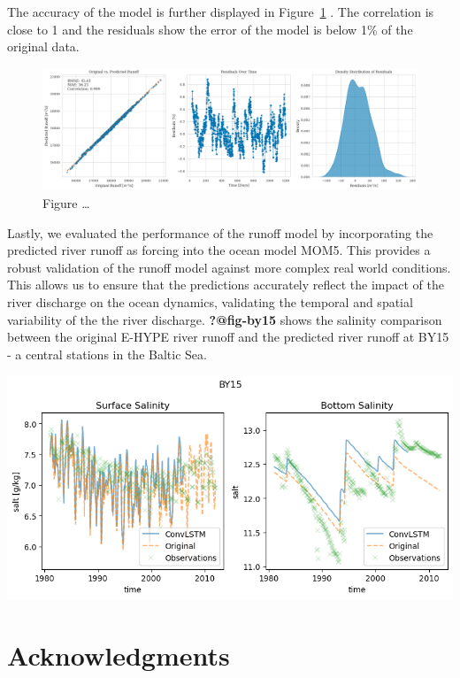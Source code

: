 \documentclass[
]{agujournal2019}
\begin{document}
The accuracy of the model is further displayed in
Figure~\ref{fig-statistical-evaluationNN} . The correlation is close to
1 and the residuals show the error of the model is below 1\% of the
original data.

\begin{figure}

{\centering \includegraphics{images/paste-4.png}

}

\caption{\label{fig-statistical-evaluationNN}Figure \ldots{}}

\end{figure}

Lastly, we evaluated the performance of the runoff model by
incorporating the predicted river runoff as forcing into the ocean model
MOM5. This provides a robust validation of the runoff model against more
complex real world conditions. This allows us to ensure that the
predictions accurately reflect the impact of the river discharge on the
ocean dynamics, validating the temporal and spatial variability of the
the river discharge. \textbf{?@fig-by15} shows the salinity comparison
between the original E-HYPE river runoff and the predicted river runoff
at BY15 - a central stations in the Baltic Sea.

\includegraphics{images/paste-5.png}

\hypertarget{acknowledgments}{%
\section{Acknowledgments}\label{acknowledgments}}
\end{document}
